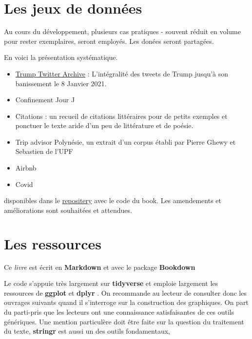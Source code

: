 \documentclass[
]{book}
\providecommand{\tightlist}{%
  \setlength{\itemsep}{0pt}\setlength{\parskip}{0pt}}
\begin{document}
\hypertarget{les-jeux-de-donnuxe9es}{%
\section{Les jeux de données}\label{les-jeux-de-donnuxe9es}}

Au cours du développement, plusieurs cas pratiques - souvent réduit en volume pour rester exemplaires, seront employés. Les donées seront partagées.

En voici la présentation systématique.

\begin{itemize}
\tightlist
\item
  \href{https://www.thetrumparchive.com/}{Trump Twitter Archive} : L'intégralité des tweets de Trump jusqu'à son banissement le 8 Janvier 2021.
\item
  Confinement Jour J
\item
  Citations : un recueil de citations littéraires pour de petits exemples et ponctuer le texte aride d'un peu de littérature et de poésie.
\item
  Trip advisor Polynésie, un extrait d'un corpus établi par Pierre Ghewy et Sebastien de l'UPF
\item
  Airbnb
\item
  Covid
\end{itemize}

disponibles dans le \href{https://benaventc.github.io/NLPBook/}{repositery} avec le code du book. Les amendements et améliorations sont souhaitées et attendues.

\hypertarget{les-ressources}{%
\section{Les ressources}\label{les-ressources}}

Ce \emph{livre} est écrit en \textbf{Markdown} \citep{allaire_rmarkdown_2021} et avec le package \textbf{Bookdown} \citep{R-bookdown}

Le code s'appuie très largement sur \textbf{tidyverse} et emploie largement les ressources de \textbf{ggplot} et \textbf{dplyr} . On recommande au lecteur de consulter donc les ouvrages suivants quand il s'interroge sur la construction des graphiques. On part du parti-pris que les lecteurs ont une connaissance satisfaisantes de ces outils génériques. Une mention particulère doit être faite sur la question du traitement du texte, \textbf{stringr} est aussi un des outils fondamentaux,
\end{document}
